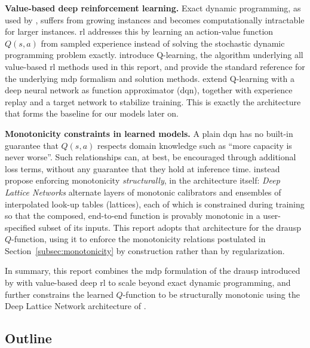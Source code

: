 \textbf{Value-based deep reinforcement learning.} Exact dynamic programming, as used by
\textcite{drausp_lion18}, suffers from growing instances and becomes computationally intractable for 
larger instances. \Acs{rl} addresses this by learning an action-value
function $Q(s,a)$ from sampled experience instead of solving the stochastic dynamic programming problem
exactly. \textcite{watkins1992} introduce Q-learning, the algorithm underlying all value-based
\acs{rl} methods used in this report, and \textcite{suttonbarto2018} provide the standard reference
for the underlying \acs{mdp} formalism and solution methods. \textcite{mnih2015} extend Q-learning
with a deep neural network as function approximator (\acs{dqn}), together with experience replay
and a target network to stabilize training. This is exactly the architecture that forms the baseline 
for our models later on.

\textbf{Monotonicity constraints in learned models.} A plain \acs{dqn} has no built-in guarantee
that $Q(s,a)$ respects domain knowledge such as ``more capacity is never worse''. Such
relationships can, at best, be encouraged through additional loss terms, without any guarantee
that they hold at inference time. \textcite{you2017} instead propose enforcing monotonicity
\emph{structurally}, in the architecture itself: \emph{Deep Lattice Networks} alternate layers of
monotonic calibrators and ensembles of interpolated look-up tables (lattices), each of which is
constrained during training so that the composed, end-to-end function is provably monotonic in a
user-specified subset of its inputs. This report adopts that architecture for the \acs{drausp} $Q$-function,
using it to enforce the monotonicity relations postulated in
Section~\ref{subsec:monotonicity} by construction rather than by regularization.

In summary, this report combines the \acs{mdp} formulation of the \acs{drausp} introduced by
\textcite{drausp_lion18} with value-based deep \acs{rl} \parencite{watkins1992,mnih2015} to scale
beyond exact dynamic programming, and further constrains the learned $Q$-function to be
structurally monotonic using the Deep Lattice Network architecture of \textcite{you2017}.

\subsection{Outline}
\label{subsec:outline}

